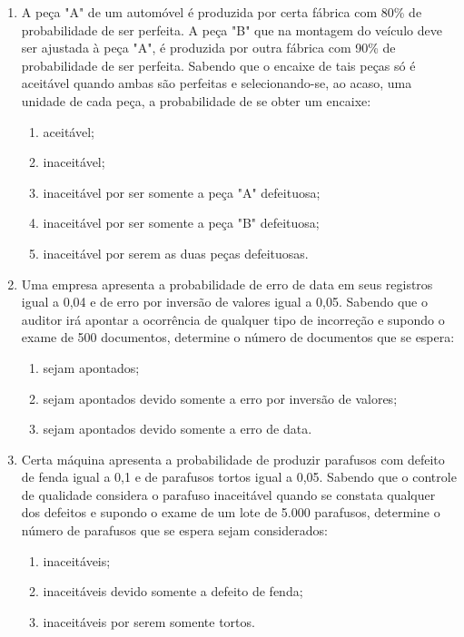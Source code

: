 \begin{enumerate}[resume]
\item A peça "A" de um automóvel é produzida por certa fábrica com 80\% de probabilidade de ser perfeita. A peça "B" que na montagem do veículo deve ser ajustada à peça "A", é produzida por outra fábrica com 90\% de probabilidade de ser perfeita. Sabendo que o encaixe de tais peças só é aceitável quando ambas são perfeitas e selecionando-se, ao acaso, uma unidade de cada peça, a probabilidade de se obter um encaixe:
	\begin{enumerate}
	\item aceitável;
	\item inaceitável;
	\item inaceitável por ser somente a peça "A" defeituosa;
	\item inaceitável por ser somente a peça "B" defeituosa;
	\item inaceitável por serem as duas peças defeituosas.
	\end{enumerate}

\item Uma empresa apresenta a probabilidade de erro de data em seus registros igual a 0,04 e de erro por inversão de valores igual a 0,05. Sabendo que o auditor irá apontar a ocorrência de qualquer tipo de incorreção e supondo o exame de 500 documentos, determine o número de documentos que se espera:
	\begin{enumerate}
	\item sejam apontados;
	\item sejam apontados devido somente a erro por inversão de valores;
	\item sejam apontados devido somente a erro de data.
	\end{enumerate}
	
\item Certa máquina apresenta a probabilidade de produzir parafusos com defeito de fenda igual a 0,1 e de parafusos tortos igual a 0,05. Sabendo que o controle de qualidade considera o parafuso inaceitável quando se constata qualquer dos defeitos e supondo o exame de um lote de 5.000 parafusos, determine o número de parafusos que se espera sejam considerados:
	\begin{enumerate}
	\item inaceitáveis;
	\item inaceitáveis devido somente a defeito de fenda;
	\item inaceitáveis por serem somente tortos.
	\end{enumerate}
	
\end{enumerate}  